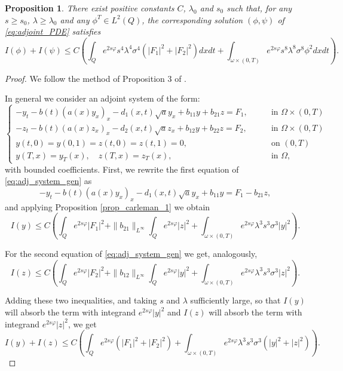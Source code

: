 \documentclass[11pt,oneside,a4papper]{osajnl}
\newtheorem{propo}{Proposition}
\begin{document}
\begin{propo} %
There exist positive constants $C$, $\lambda_0$ and $s_0$ such that, for any $s \geq s_0$, $\lambda \geq \lambda_0$ and any $\phi^T \in L^2(Q)$, the corresponding solution $(\phi,\psi)$ of \eqref{eq:adjoint_PDE} satisfies
\begin{equation}\label{carleman}
I(\phi) + I(\psi) \leq C \left( \int_Q e^{2s\varphi} s^4 \lambda^4 \sigma^4 (|F_1|^2+|F_2|^2)dxdt + \int_{\omega\times(0,T)} e^{2s\varphi} s^8 \lambda^8 \sigma^8 \phi^2dxdt \right).
\end{equation}
\end{propo}

\begin{proof}
    We follow the method of Proposition 3 of \cite{DemarqueLimacoViana_deg_sys2020}.

In general we consider an adjoint system of the form:
\begin{equation}
\label{eq:adj_system_gen}
\begin{cases}
    -y_t - b(t)(a(x)y_x)_x - d_1(x,t)\sqrt{a}y_x + b_{11}y + b_{21}z = F_1,\qquad & \text{in } \Omega \times (0,T) \\
    -z_t - b(t)(a(x)z_x)_x - d_2(x,t)\sqrt{a}z_x + b_{12}y + b_{22}z = F_2,\qquad & \text{in } \Omega \times (0,T) \\
    y(t,0)=y(0,1)=z(t,0)=z(t,1)=0, \qquad & \text{on } (0,T) \\
    y(T,x)=y_T(x), \quad z(T,x)=z_T(x), \qquad & \text{in } \Omega, 
\end{cases}    
\end{equation}
with bounded coefficients. First, we rewrite the first equation of \eqref{eq:adj_system_gen} as
$$
-y_t - b(t)(a(x)y_x)_x - d_1(x,t)\sqrt{a}y_x + b_{11}y  = F_1 -b_{21}z,
$$
and applying Proposition \ref{prop_carleman_1} we obtain
$$
I(y) \leq C \left( \int_Q e^{2s \varphi}|F_1|^2 + \|b_{21}\|_{L^\infty} \int_Q e^{2s \varphi}|z|^2 + \int_{\omega \times (0,T)} e^{2s \varphi} \lambda^3 s^3 \sigma^3 |y|^2 \right).
$$

For the second equation of \eqref{eq:adj_system_gen} we get, analogously,
$$
I(z) \leq C \left( \int_Q e^{2s \varphi}|F_2|^2 + \|b_{12}\|_{L^\infty} \int_Q e^{2s \varphi}|y|^2 + \int_{\omega \times (0,T)} e^{2s \varphi} \lambda^3 s^3 \sigma^3 |z|^2 \right).
$$

Adding these two inequalities, and taking $s$ and $\lambda$ sufficiently large, so that $I(y)$ will absorb the term with integrand $e^{2s \varphi} |y|^2$ and $I(z)$ will absorb the term with integrand $e^{2s \varphi} |z|^2$, we get
$$
I(y)+I(z) \leq C \left( \int_Q e^{2s \varphi} (|F_1|^2 + |F_2|^2) + \int_{\omega \times (0,T)} e^{2s \varphi} \lambda^3 s^3 \sigma^3 (|y|^2 +|z|^2) \right).
$$


\end{proof}
\end{document}
